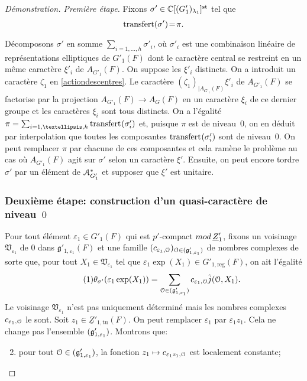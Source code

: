 \documentclass[11pt]{article}
\numberwithin{equation}{section}\providecommand{\og}{«\,}\providecommand{\fg}{\,»}
\let\mathcal \EuScript
\newcommand{\NoChangel}[1]{%
\expandafter\let\csname old\string#1\endcsname=#1
\let#1=\relax
\newcommand{#1}{\mathcode`l="716C\csname old\string#1\endcsname\mathcode`l="7160 }%
}
\let\epsilon\varepsilon
\newcommand\mto{\mathchoice{\longmapsto}{\mapsto}{\mapsto}{\mapsto}}
\newcommand{\rmod}{\textup{mod}\,}
\newcommand{\frg}{\mathfrak{g}}
\newcommand{\frV}{\mathfrak{V}}
\newcommand{\rell}{\mathrm{ell}} \NoChangel{\rell}
\newcommand{\Ell}{\mathrm{Ell}} \NoChangel{\Ell}
\newcommand{\Nil}{\mathrm{Nil}} \NoChangel{\Nil}
\newcommand{\reg}{\mathrm{reg}}
\newcommand{\st}{\mathrm{st}}
\newcommand{\tu}{\mathrm{tu}}
\DeclareMathOperator{\transfert}{transfert}
\newcommand{\cA}{\mathcal{A}}
\newcommand{\cO}{\mathcal{O}}
\newcommand{\CC}{\mathbb{C}}
\theoremstyle{plain}
\theoremstyle{definition}
\renewcommand{\proofname}{Démonstration}
\begin{document}
\begin{proof}[\proofname. Première étape]
Fixons $\sigma'\in\CC[\Ell(G'_{1})_{\lambda_{1}}]^{\st}$ tel que \[
\transfert_{\rell}(\sigma')\!=\!\pi.
\]
Décomposons $\sigma'$ en somme $\sum_{i=1,\dots,h}\sigma'_{i}$, où $\sigma'_{i}$ est une combinaison linéaire de représentations elliptiques de $G'_{1}(F)$ dont le caractère central se restreint en un même carac\-tère $\xi'_{i}$ de $A_{G'_{1}}(F)$. On suppose les $\xi'_{i}$ distincts. On a introduit un caractère $\zeta_{1}$ en \ref{actiondescentres}. Le caractère $(\zeta_{1})_{ \vert A_{G'_{1}}(F)}\xi'_{i}$ de $A_{G'_{1}}(F)$ se factorise par la projection $A_{G'_{1}}(F)\to A_{G}(F)$ en un caractère $\xi_{i}$ de ce dernier groupe et les caractères $\xi_{i}$ sont tous distincts. On a l'égalité $\pi=\sum_{i=1,\dots,h}\transfert_{\rell}(\sigma'_{i})$ et, puisque $\pi$ est de niveau~$0$, on en déduit par interpolation que toutes les composantes $\transfert_{\rell}(\sigma'_{i})$ sont de niveau~$0$. On peut remplacer $\pi$ par chacune de ces composantes et cela ramène le problème au cas où $A_{G'_{1}}(F)$ agit sur $\sigma'$ selon un caractère $\xi'$. Ensuite, on peut encore tordre $\sigma'$ par un élément de $\cA_{G'_{1}}^*$ et supposer que $\xi'$ est unitaire.

\subsubsection*{Deuxième étape: construction d'un quasi-caractère de niveau~$0$}

Pour tout élément $\epsilon_{1}\in G'_{1}(F)$ qui est $p'$-compact $\rmod \underline{Z}'_{1}$, fixons un voisinage $\frV_{\epsilon_{1}}$ de $0$ dans $\frg'_{1,\epsilon_{1}}(F)$ et une famille $(c_{\epsilon_{1},\cO})_{\cO\in \Nil(\frg'_{1,\epsilon_{1}})}$ de nombres complexes de sorte que, pour tout $X_{1}\in \frV_{\epsilon_{1}}$ tel que $\epsilon_{1}\exp(X_{1})\in G'_{1,\reg}(F)$, on ait l'égalité
\begin{equation}\tag{1}\label{unereciproque1}
\theta_{\sigma'}(\epsilon_{1}\exp(X_{1}))=\sum_{\cO\in \Nil(\frg'_{1,\epsilon_{1}})}c_{\epsilon_{1},\cO}\hat{j}(\cO,X_{1}).
\end{equation}
Le voisinage $\frV_{\epsilon_{1}}$ n'est pas uniquement déterminé mais les nombres complexes $c_{\epsilon_{1},\cO}$ le sont. Soit $z_{1}\in \underline{Z}'_{1,\tu}(F)$. On peut remplacer $\epsilon_{1}$ par $\epsilon_{1}z_{1}$. Cela ne change pas l'ensemble $\Nil(\frg'_{1,\epsilon_{1}})$. Montrons que:
\begin{enumerate}\setcounter{enumi}{1}
\item\label{unereciproque2}
pour tout $\cO\in \Nil(\frg'_{1,\epsilon_{1}})$, la fonction $z_{1}\mto c_{\epsilon_{1}z_{1},\cO}$ est localement constante;


\end{enumerate}
\end{proof}
\end{document}
